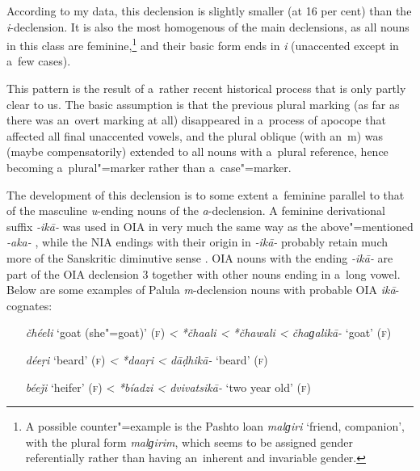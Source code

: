 According to my data, this declension is slightly smaller (at 16 per cent) than the \textit{i}-declension. It is also the most homogenous of the main declensions, as all nouns in this class are feminine,\footnote{A possible counter"=example is the Pashto loan \textit{malɡiri} `friend, companion', with the plural form \textit{malɡirim}, which seems to be assigned gender referentially rather than having an~inherent and invariable gender.} and their basic form ends in \textit{i} (unaccented except in a~few cases).


This pattern is the result of a~rather recent historical process that is only partly clear to us. The basic assumption is that the previous plural marking (as far as there was an~overt marking at all) disappeared in a~process of apocope that affected all final unaccented vowels, and the plural oblique (with an~m) was (maybe compensatorily) extended to all nouns with a~plural reference, hence becoming a~plural"=marker rather than a~case"=marker.


The development of this declension is to some extent a~feminine parallel to that of the masculine \textit{u}-ending nouns of the \textit{a}-declension. A feminine derivational suffix \textit{-ikā-} was used in OIA in very much the same way as the above"=mentioned \textit{-aka-} \citep[1222]{whitney1960}, while the NIA endings with their origin in \textit{-ikā-} probably retain much more of the Sanskritic diminutive sense \citep[222]{masica1991}. OIA nouns with the ending \textit{-ikā-} are part of the OIA declension 3 together with other nouns ending in a~long vowel. Below are some examples of Palula \textit{m}-declension nouns with probable OIA \textit{ikā}-cognates: 


\begin{itemize}[leftmargin=]
\item[\textit{čhéeli} `goat (she"=goat)' (\textsc{f})] \textit{{\textless} *čhaali {\textless} *čhawali {\textless} čhaɡalikā-} `goat' (\textsc{f})
\item[\textit{déeṛi} `beard' (\textsc{f})] \textit{{\textless} *daaṛi {\textless} dāḍhikā-} `beard' (\textsc{f})
\item[\textit{béeǰi} `heifer' (\textsc{f})] {\textless} \textit{*bíadzi {\textless} dvivatsikā-} `two year old' (\textsc{f})
\end{itemize}

